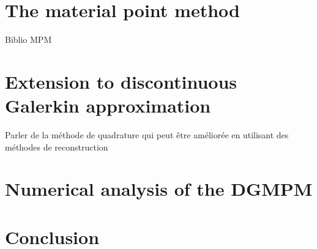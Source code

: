 \section{The material point method}
\label{sec:MPM}

Biblio MPM 

\section{Extension to discontinuous Galerkin approximation}
\label{sec:DGMPM}

Parler de la méthode de quadrature qui peut être améliorée en utilisant des méthodes de  reconstruction \cite{BsplineMPM}\cite{MPM_BSpline1}

% 

\section{Numerical analysis of the DGMPM}
\label{sec:DGMPM_analysis}



\section*{Conclusion}

